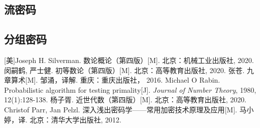 \documentclass{article}
\numberwithin{equation}{subsubsection}
\begin{document}
\subsection{流密码}
\subsection{分组密码}
\newpage
\begin{thebibliography}{99}
     [美]Joseph H. Silverman. 数论概论（第四版）[M]. 北京：机械工业出版社, 2020.
     闵嗣鹤, 严士健. 初等数论（第四版）[M]. 北京：高等教育出版社, 2020.  
     张苍. 九章算术[M]. 邹涌，译解. 重庆：重庆出版社， 2016.
     Michael O Rabin. Probabilistic algorithm for testing primality[J]. \textit{Journal of Number Theory}, 1980, 12(1):128-138.
     杨子胥. 近世代数（第四版）[M]. 北京：高等教育出版社, 2020.
     Christof Parr, Jan Pelzl. 深入浅出密码学——常用加密技术原理及应用[M]. 马小婷，译. 北京：清华大学出版社, 2012.
\end{thebibliography}
\end{document}
